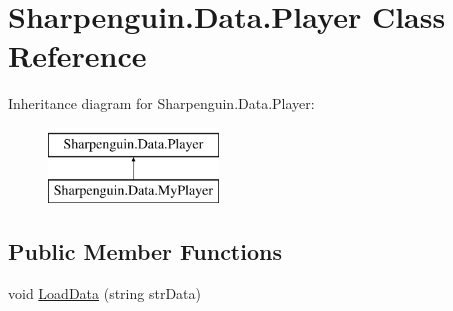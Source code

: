 \hypertarget{classSharpenguin_1_1Data_1_1Player}{\section{\-Sharpenguin.\-Data.\-Player \-Class \-Reference}
\label{classSharpenguin_1_1Data_1_1Player}
}
\-Inheritance diagram for \-Sharpenguin.\-Data.\-Player\-:\begin{figure}[H]
\begin{center}
\leavevmode
\includegraphics[height=2.000000cm]{classSharpenguin_1_1Data_1_1Player}
\end{center}
\end{figure}
\subsection*{\-Public \-Member \-Functions}
\begin{DoxyCompactItemize}
\item 
void \hyperlink{classSharpenguin_1_1Data_1_1Player_a22a732a7064e1ce773d624602527c880}{\-Load\-Data} (string str\-Data)
\end{DoxyCompactItemize}
